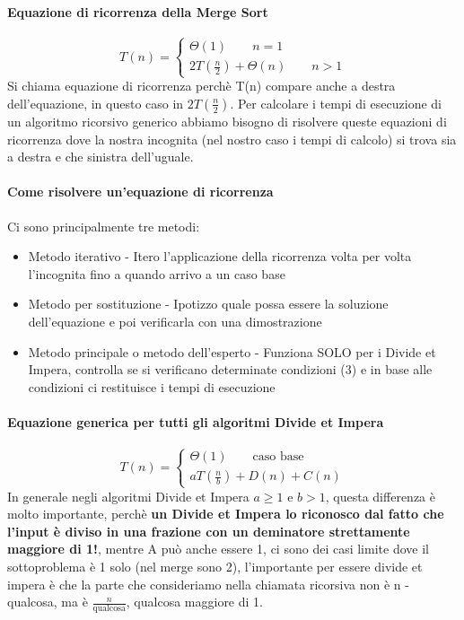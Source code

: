 \paragraph*{Equazione di ricorrenza della Merge Sort}
\begin{equation*}
    T(n)=
    \begin{cases}
        \Theta(1) \qquad n=1 \\
        2T(\frac{n}{2}) + \Theta(n) \qquad n>1
    \end{cases}
\end{equation*}
Si chiama equazione di ricorrenza perchè T(n) compare anche a destra dell'equazione, in questo caso
in $2T(\frac{n}{2})$. Per calcolare i tempi di esecuzione di un algoritmo ricorsivo generico abbiamo
bisogno di risolvere queste equazioni di ricorrenza dove la nostra incognita (nel nostro caso i tempi di calcolo) si trova
sia a destra e che sinistra dell'uguale.
\paragraph*{Come risolvere un'equazione di ricorrenza} Ci sono principalmente tre metodi:
\begin{itemize}
    \item Metodo iterativo - Itero l'applicazione della ricorrenza volta per volta l'incognita fino a quando arrivo a un caso base
    \item Metodo per sostituzione - Ipotizzo quale possa essere la soluzione dell'equazione e poi verificarla
    con una dimostrazione
    \item Metodo principale o metodo dell'esperto - Funziona SOLO per i Divide et Impera, controlla se si
    verificano determinate condizioni (3) e in base alle condizioni ci restituisce i tempi di esecuzione
\end{itemize}
\paragraph*{Equazione generica per tutti gli algoritmi Divide et Impera}
\begin{equation*}
    T(n)=
    \begin{cases}
        \Theta(1) \qquad \text{caso base}\\
        aT(\frac{n}{b}) + D(n)+C(n)
    \end{cases}
\end{equation*}
In generale negli algoritmi Divide et Impera $a \geq 1$ e $b > 1$, questa differenza è molto
importante, perchè \textbf{un Divide et Impera lo riconosco dal fatto che l'input è diviso in una frazione
con un deminatore strettamente maggiore di 1!}, mentre A può anche essere 1, ci sono dei casi limite
dove il sottoproblema è 1 solo (nel merge sono 2), l'importante per essere divide et impera è che la parte
che consideriamo nella chiamata ricorsiva non è n - qualcosa, ma è $\frac{n}{\text{qualcosa}}$, qualcosa
maggiore di 1.

